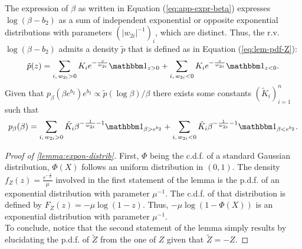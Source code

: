 The expression of $\beta$ as written in Equation (\ref{eq:app-expr-beta}) expresses $\log(\beta-b_2)$ as a sum of independent exponential or opposite exponential distributions with parameters $(|w_{2i}|^{-1})_{i}$, which are distinct.
Thus, the r.v. $\log(\beta-b_2)$ admits a density $\tilde p$ that is defined as in Equation (\ref{eq:lem-pdf-Z}):
\begin{equation}
    \tilde p(z) = \sum_{i,\,w_{2i}>0}K_ie^{-\frac{z}{w_{2i}}}\indic_{z>0} + \sum_{i,\,w_{2i}<0}K_ie^{-\frac{z}{w_{2i}}}\indic_{z<0}.
\end{equation}
Given that $p_\beta(\beta e^{b_2})e^{b_2}\propto\tilde p(\log\beta) / \beta$ there exists some constants $(\tilde K_i)_{i=1}^n$ such that
\begin{equation}
    p_\beta(\beta) = \sum_{i,\,w_{2i}>0}\tilde K_i\beta^{-\frac{1}{w_{2i}}-1}\indic_{\beta>e^{b_2}} + \sum_{i,\,w_{2i}<0}\tilde K_i\beta^{-\frac{1}{w_{2i}}-1}\indic_{\beta<e^{b_2}}.
\end{equation}


\begin{proof}[{Proof of \cref{lemma:expon-distrib}}]
First, $\Phi$ being the c.d.f. of a standard Gaussian distribution, $\Phi(X)$ follows an uniform distribution in $(0,1)$.
The density $f_Z(z)=\frac{e^{-\frac{z}{\mu}}}{\mu}$ involved in the first statement of the lemma is the p.d.f. of an exponential distribution with parameter $\mu^{-1}$. The c.d.f. of that distribution is defined by $F_Z(z) = -\mu\log(1-z)$.
Thus, $-\mu\log(1-\Phi(X))$ is an exponential distribution with parameter $\mu^{-1}$.\\
To conclude, notice that the second statement of the lemma simply results by elucidating the p.d.f. of $\tilde Z$ from the one of $Z$ given that $\tilde Z=-Z$.
\end{proof}



